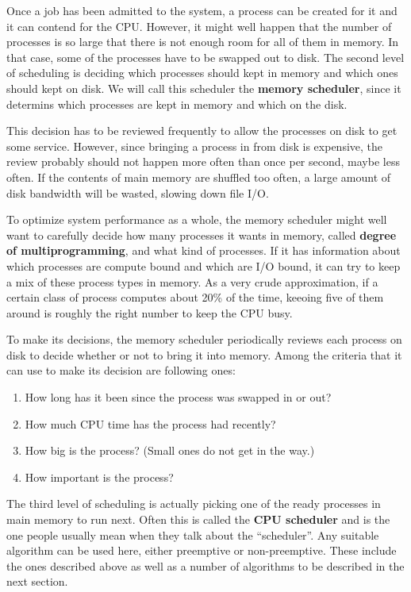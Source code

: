 \documentclass{book}
\newcommand {\kw}  [1] {\textbf{#1}}
\begin{document}
Once a job has been admitted to the system, a process can be created for it and it can contend for the CPU.
However, it might well happen that the number of processes is so large that there is not enough room for all of them in memory.
In that case, some of the processes have to be swapped out to disk.
The second level of scheduling is deciding which processes should kept in memory and which ones should kept on disk.
We will call this scheduler the \kw{memory scheduler}, since it determins which processes are kept in memory and which on the disk.

This decision has to be reviewed frequently to allow the processes on disk to get some service.
However, since bringing a process in from disk is expensive, 
the review probably should not happen more often than once per second, maybe less often.
If the contents of main memory are shuffled too often, a large amount of disk bandwidth will be wasted, slowing down file I/O.

To optimize system performance as a whole, the memory scheduler might well want to carefully decide how many processes it wants in memory,
called \kw{degree of multiprogramming}, and what kind of processes.
If it has information about which processes are compute bound and which are I/O bound, 
it can try to keep a mix of these process types in memory.
As a very crude approximation, if a certain class of process computes about 20\% of the time, 
keeoing five of them around is roughly the right number to keep the CPU busy.

To make its decisions, the memory scheduler periodically reviews each process on disk to decide whether or not to bring it into memory.
Among the criteria that it can use to make its decision are following ones:
\begin{enumerate}
  \item How long has it been since the process was swapped in or out?
  \item How much CPU time has the process had recently?
  \item How big is the process? (Small ones do not get in the way.)
  \item How important is the process?
\end{enumerate}

The third level of scheduling is actually picking one of the ready processes in main memory to run next.
Often this is called the \kw{CPU scheduler} and is the one people usually mean when they talk about the ``scheduler''.
Any suitable algorithm can be used here, either preemptive or non-preemptive.
These include the ones described above as well as a number of algorithms to be described in the next section.
\end{document}
